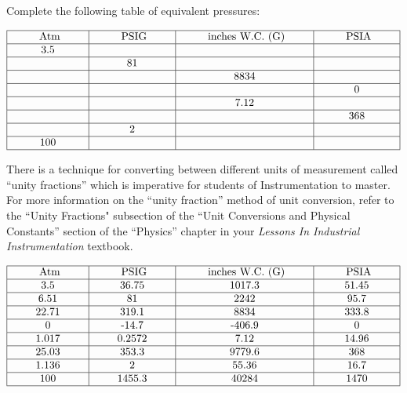 

Complete the following table of equivalent pressures:


$$\vbox{\offinterlineskip
\halign{\strut
\vrule \quad\hfil # \ \hfil & 
\vrule \quad\hfil # \ \hfil & 
\vrule \quad\hfil # \ \hfil & 
\vrule \quad\hfil # \ \hfil \vrule \cr
\noalign{\hrule}
%
\hskip 20pt Atm \hskip 20pt & \hskip 20pt PSIG \hskip 20pt & \hskip 20pt inches W.C. (G) \hskip 20pt & \hskip 20pt PSIA \hskip 20pt \cr
%
\noalign{\hrule}
%
3.5 &  &  &  \cr
%
\noalign{\hrule}
%
  & 81 &  &  \cr
%
\noalign{\hrule}
%
  &  & 8834 &  \cr
%
\noalign{\hrule}
%
  &  &  & 0 \cr
%
\noalign{\hrule}
%
  &  & 7.12 &  \cr
%
\noalign{\hrule}
%
  &  &  & 368 \cr
%
\noalign{\hrule}
%
  & 2 &  &  \cr
%
\noalign{\hrule}
%
100 &  &  &  \cr
%
\noalign{\hrule}
} %
}$$ %

\vskip 10pt

There is a technique for converting between different units of measurement called ``unity fractions'' which is imperative for students of Instrumentation to master.  For more information on the ``unity fraction'' method of unit conversion, refer to the ``Unity Fractions" subsection of the ``Unit Conversions and Physical Constants'' section of the ``Physics'' chapter in your {\it Lessons In Industrial Instrumentation} textbook.







$$\vbox{\offinterlineskip
\halign{\strut
\vrule \quad\hfil # \ \hfil & 
\vrule \quad\hfil # \ \hfil & 
\vrule \quad\hfil # \ \hfil & 
\vrule \quad\hfil # \ \hfil \vrule \cr
\noalign{\hrule}
%
\hskip 20pt Atm \hskip 20pt & \hskip 20pt PSIG \hskip 20pt & \hskip 20pt inches W.C. (G) \hskip 20pt & \hskip 20pt PSIA \hskip 20pt \cr
%
\noalign{\hrule}
%
3.5 & 36.75 & 1017.3 & 51.45 \cr
%
\noalign{\hrule}
%
6.51 & 81 & 2242 & 95.7 \cr
%
\noalign{\hrule}
%
22.71 & 319.1 & 8834 & 333.8 \cr
%
\noalign{\hrule}
%
0 & -14.7 & -406.9 & 0 \cr
%
\noalign{\hrule}
%
1.017 & 0.2572 & 7.12 & 14.96 \cr
%
\noalign{\hrule}
%
25.03 & 353.3 & 9779.6 & 368 \cr
%
\noalign{\hrule}
%
1.136 & 2 & 55.36 & 16.7 \cr
%
\noalign{\hrule}
%
100 & 1455.3 & 40284 & 1470 \cr
%
\noalign{\hrule}
} %
}$$ %










